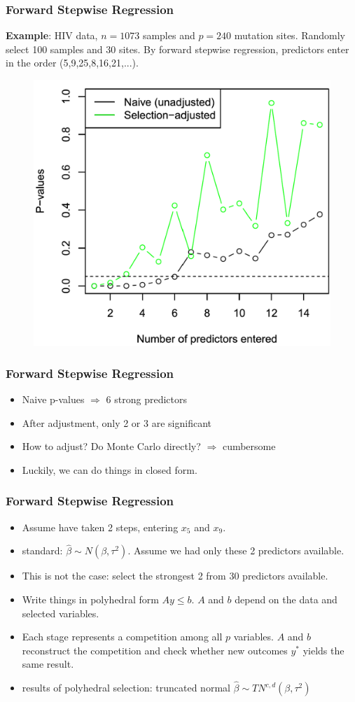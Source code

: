 \documentclass{beamer}
\begin{document}
\begin{frame}
\frametitle{Forward Stepwise Regression}
\textbf{Example}: HIV data, $n=1073$ samples and $p=240$ mutation sites. Randomly select 100 samples and 30 sites. By forward stepwise regression, predictors enter in the order (5,9,25,8,16,21,...).
\begin{figure}
	\includegraphics[width=0.6\linewidth]{stepwise_hiv.png}
\end{figure}
\end{frame}

\begin{frame}
\frametitle{Forward Stepwise Regression}
\begin{itemize}
	\item 
	Naive p-values $\Rightarrow$ 6 strong predictors
	\item
	After adjustment, only 2 or 3 are significant
	\item
	How to adjust? Do Monte Carlo directly? $\Rightarrow$ cumbersome
	\item
	Luckily, we can do things in closed form.
\end{itemize}
\end{frame}

\begin{frame}
\frametitle{Forward Stepwise Regression}
\begin{itemize}
	\item
	Assume have taken 2 steps, entering $x_5$ and $x_9$.
	\item
	standard: $\hat{\beta}\sim N(\beta, \tau^2)$. Assume we had only these 2 predictors available.
	\item
	This is not the case: select the strongest 2 from 30 predictors available.
	\item
	Write things in polyhedral form $Ay \leq b$. $A$ and $b$ depend on the data and selected variables.
	\item
	Each stage represents a competition among all $p$ variables. $A$ and $b$ reconstruct the competition and check whether new outcomes $y^*$ yields the same result.
	\item
	results of polyhedral selection: truncated normal $\hat{\beta}\sim TN^{c,d}(\beta, \tau^2)$
\end{itemize}
\end{frame}
\end{document}
